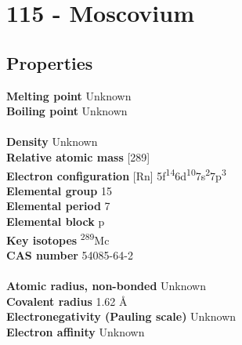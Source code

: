 \section{115 - Moscovium}
\label{sec:elem-moscovium}
\subsection{Properties}
\textbf{Melting point} Unknown\\
\textbf{Boiling point} Unknown\\
\\
\textbf{Density} Unknown\\
\textbf{Relative atomic mass} [289]\\
\textbf{Electron configuration} [Rn] 5f\textsuperscript{14}6d\textsuperscript{10}7s\textsuperscript{2}7p\textsuperscript{3}\\
\textbf{Elemental group} 15\\
\textbf{Elemental period} 7\\
\textbf{Elemental block} p\\
\textbf{Key isotopes} \textsuperscript{289}Mc\\
\textbf{CAS number} 54085-64-2\\
\\
\textbf{Atomic radius, non-bonded} Unknown\\
\textbf{Covalent radius} 1.62 Å\\
\textbf{Electronegativity (Pauling scale)} Unknown\\
\textbf{Electron affinity} Unknown\\